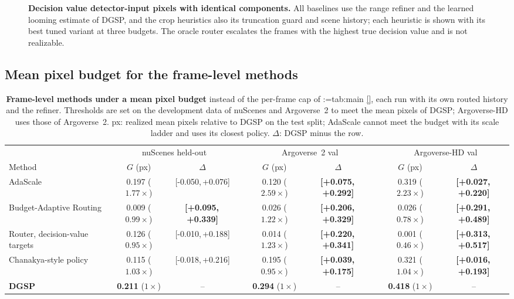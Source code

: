 \documentclass[10pt,letterpaper]{article}
\makeatletter
\newcommand{\method}{DGSP\xspace}
\newcommand{\G}{G}
\newcommand{\ci}[2]{[#1,\allowbreak\,#2]}
\newcommand{\best}[1]{\textbf{#1}}
\newcommand{\oursrow}{\rowcolor{oursbg}}
\newcommand{\na}{--}
\theoremstyle{remark}
\theoremstyle{plain}
\theoremstyle{definition}
\DeclareRobustCommand{\mref}[1]{\def\mref@list{}\@for\mref@i:=#1\do{\ifx\mref@list\@empty\edef\mref@list{M-\mref@i}\else\edef\mref@list{\mref@list,M-\mref@i}\fi}%
  \edef\mref@cmd{\noexpand\cref*{\mref@list}}\mref@cmd}
\makeatother
\begin{document}
\begin{figure}[!tbp]
\vspace{2pt}
\caption{\textbf{Decision value \vs detector-input pixels with identical components.} All baselines use the range refiner and the learned looming estimate of \method, and the crop heuristics also its truncation guard and scene history; each heuristic is shown with its best tuned variant at three budgets. The oracle router escalates the frames with the highest true decision value and is not realizable.}
\label{fig:pareto}
\end{figure}

\subsection{Mean pixel budget for the frame-level methods}
\label{sec:supp_meanbudget}

\begin{table}[!htbp]
\centering
\caption{\textbf{Frame-level methods under a mean pixel budget} instead of the per-frame cap of \mref{tab:main}, each run with its own routed history and the refiner. Thresholds are set on the development data of nuScenes and Argoverse~2 to meet the mean pixels of \method; Argoverse-HD uses those of Argoverse~2. px: realized mean pixels relative to \method on the test split; AdaScale cannot meet the budget with its scale ladder and uses its closest policy. $\Delta$: \method minus the row.}
\label{tab:meanbudget}
\footnotesize
\setlength{\tabcolsep}{2.2pt}
\begin{tabular}{@{}lcccccccc@{}}
\toprule
 & \multicolumn{2}{c}{nuScenes held-out} & & \multicolumn{2}{c}{Argoverse~2 val} & & \multicolumn{2}{c}{Argoverse-HD val} \\
\cmidrule(lr){2-3}\cmidrule(lr){5-6}\cmidrule(l){8-9}
Method & $\G$ (px) & $\Delta$ & & $\G$ (px) & $\Delta$ & & $\G$ (px) & $\Delta$ \\
\midrule
AdaScale & 0.197 ($1.77\times$) & \ci{-0.050}{+0.076} & & 0.120 ($2.59\times$) & \best{\ci{+0.075}{+0.292}} & & 0.319 ($2.23\times$) & \best{\ci{+0.027}{+0.220}} \\
Budget-Adaptive Routing & 0.009 ($0.99\times$) & \best{\ci{+0.095}{+0.339}} & & 0.026 ($1.22\times$) & \best{\ci{+0.206}{+0.329}} & & 0.026 ($0.78\times$) & \best{\ci{+0.291}{+0.489}} \\
Router, decision-value targets & 0.126 ($0.95\times$) & \ci{-0.010}{+0.188} & & 0.014 ($1.23\times$) & \best{\ci{+0.220}{+0.341}} & & 0.001 ($0.46\times$) & \best{\ci{+0.313}{+0.517}} \\
Chanakya-style policy & 0.115 ($1.03\times$) & \ci{-0.018}{+0.216} & & 0.195 ($0.95\times$) & \best{\ci{+0.039}{+0.175}} & & 0.321 ($1.04\times$) & \best{\ci{+0.016}{+0.193}} \\
\midrule
\oursrow \textbf{\method} & \textbf{0.211} ($1\times$) & \na & & \textbf{0.294} ($1\times$) & \na & & \textbf{0.418} ($1\times$) & \na \\
\bottomrule
\end{tabular}
\end{table}
\end{document}
